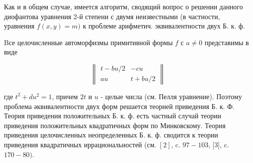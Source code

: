 \documentclass[10pt]{article}
\begin{document}
Как и в общем случае, имеется алгоритм, сводящий вопрос о решении данного диофантова уравнения 2-й степени с двумя неизвестными (в частности, уравнения $f(x, y)=m)$ к проблеме арифметич. эквивалентности двух Б. к. ф.



Bсе целочисленные автоморфизмы примитивной формы $f$ с $a \neq 0$ представимы в виде



\[

\left\|\begin{array}{cc}

t-b u / 2 & -c u \\

a u & t+b u / 2

\end{array}\right\|

\]



где $t^{2}+d u^{2}=1$, причем $2 t$ и $u$ - целые числа (см. Пелля уравнение). Поэтому проблема әквивалентности двух форм решается теорией приведения Б. к. Ф. Теория приведения положительных Б. к. ф. есть частный случай теории приведения положительных квадратичных форм по Минковскому. Теория приведения целочисленных неопределенных Б. к. ф. сводится к теории приведения квадратичных иррациональностей (см. $[2]$, c. $97-103$, [3], c. $170-80)$.
\end{document}
